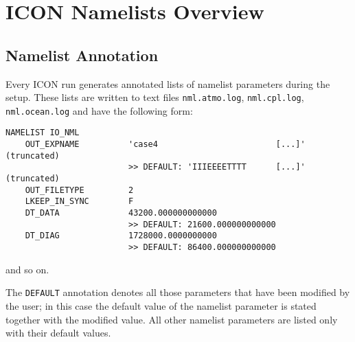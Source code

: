 
\chapter{ICON Namelists Overview}\label{chap:namelists}

\section{Namelist Annotation}
Every ICON run generates annotated lists of namelist parameters during the setup. These lists are written to text files {\tt nml.atmo.log}, {\tt nml.cpl.log}, {\tt nml.ocean.log} and have the following form:

\begin{small}
\begin{verbatim}
NAMELIST IO_NML
    OUT_EXPNAME          'case4                        [...]' (truncated)
                         >> DEFAULT: 'IIIEEEETTTT      [...]' (truncated)
    OUT_FILETYPE         2
    LKEEP_IN_SYNC        F
    DT_DATA              43200.000000000000
                         >> DEFAULT: 21600.000000000000
    DT_DIAG              1728000.0000000000
                         >> DEFAULT: 86400.000000000000
\end{verbatim}
\end{small}

and so on.

The {\tt DEFAULT} annotation denotes all those parameters that have been modified by the user; in this case the default value of the namelist parameter is stated together with the modified value. All other namelist parameters are listed only with their default values.


